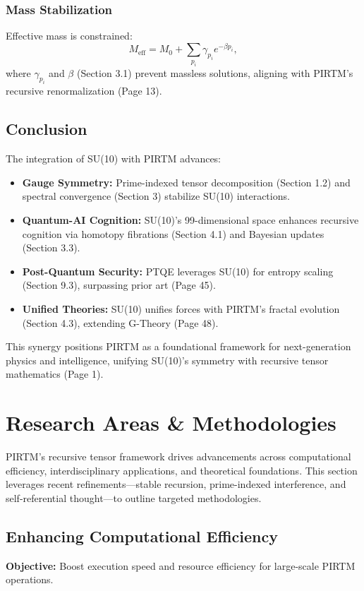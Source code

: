 \documentclass{article}
\theoremstyle{plain}
\begin{document}
\subsubsection{Mass Stabilization}
Effective mass is constrained:
\[
M_{\text{eff}} = M_0 + \sum_{p_i} \gamma_{p_i} e^{-\beta p_i},
\]
where \( \gamma_{p_i} \) and \( \beta \) (Section 3.1) prevent massless solutions, aligning with PIRTM’s recursive renormalization (Page 13).

\subsection{Conclusion}

The integration of SU(10) with PIRTM advances:
\begin{itemize}
    \item \textbf{Gauge Symmetry:} Prime-indexed tensor decomposition (Section 1.2) and spectral convergence (Section 3) stabilize SU(10) interactions.
    \item \textbf{Quantum-AI Cognition:} SU(10)’s 99-dimensional space enhances recursive cognition via homotopy fibrations (Section 4.1) and Bayesian updates (Section 3.3).
    \item \textbf{Post-Quantum Security:} PTQE leverages SU(10) for entropy scaling (Section 9.3), surpassing prior art (Page 45).
    \item \textbf{Unified Theories:} SU(10) unifies forces with PIRTM’s fractal evolution (Section 4.3), extending G-Theory (Page 48).
\end{itemize}
This synergy positions PIRTM as a foundational framework for next-generation physics and intelligence, unifying SU(10)’s symmetry with recursive tensor mathematics (Page 1).
\section{Research Areas \& Methodologies}
\label{sec:research_areas}

PIRTM’s recursive tensor framework drives advancements across computational efficiency, interdisciplinary applications, and theoretical foundations. This section leverages recent refinements—stable recursion, prime-indexed interference, and self-referential thought—to outline targeted methodologies.

\subsection{Enhancing Computational Efficiency}
\textbf{Objective:} Boost execution speed and resource efficiency for large-scale PIRTM operations.
\end{document}
